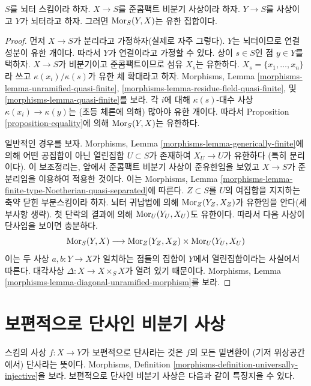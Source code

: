 \begin{lemma}
\label{lemma-finitely-many-maps-to-unramified}
$S$를 뇌터 스킴이라 하자. $X \to S$를 준콤팩트 비분기 사상이라 하자.
$Y \to S$를 사상이고 $Y$가 뇌터라고 하자. 그러면
$\mathop{\mathrm{Mor}}\nolimits_S(Y, X)$는 유한 집합이다.
\end{lemma}

\begin{proof}
먼저 $X \to S$가 분리라고 가정하자(실제로 자주 그렇다).
$Y$는 뇌터이므로 연결 성분이 유한 개이다. 따라서 $Y$가 연결이라고
가정할 수 있다. 상이 $s \in S$인 점 $y \in Y$를 택하자.
$X \to S$가 비분기이고 준콤팩트이므로 섬유 $X_s$는 유한하다.
$X_s = \{x_1, \ldots, x_n\}$라 쓰고
$\kappa(x_i)/\kappa(s)$가 유한 체 확대라고 하자.
Morphisms, Lemma \ref{morphisms-lemma-unramified-quasi-finite},
\ref{morphisms-lemma-residue-field-quasi-finite}, 및
\ref{morphisms-lemma-quasi-finite}를 보라.
각 $i$에 대해 $\kappa(s)$-대수 사상
$\kappa(x_i) \to \kappa(y)$는 (초등 체론에 의해) 많아야 유한 개이다.
따라서 Proposition \ref{proposition-equality}에 의해
$\mathop{\mathrm{Mor}}\nolimits_S(Y, X)$는 유한하다.

\medskip\noindent
일반적인 경우를 보자. Morphisms, Lemma
\ref{morphisms-lemma-generically-finite}에 의해 어떤 공집합이 아닌
열린집합 $U \subset S$가 존재하여 $X_U \to U$가 유한하다
(특히 분리이다). 이 보조정리는, 앞에서 준콤팩트 비분기 사상이
준유한임을 보였고 $X \to S$가 준분리임을 이용하여 적용한 것이다.
이는 Morphisms, Lemma
\ref{morphisms-lemma-finite-type-Noetherian-quasi-separated}에 따른다.
$Z \subset S$를 $U$의 여집합을 지지하는 축약 닫힌 부분스킴이라 하자.
뇌터 귀납법에 의해 $\mathop{\mathrm{Mor}}\nolimits_Z(Y_Z, X_Z)$가 유한임을 안다(세부사항 생략).
첫 단락의 결과에 의해 $\mathop{\mathrm{Mor}}\nolimits_U(Y_U, X_U)$도 유한이다.
따라서 다음 사상이 단사임을 보이면 충분하다.
$$
\mathop{\mathrm{Mor}}\nolimits_S(Y, X) \longrightarrow \mathop{\mathrm{Mor}}\nolimits_Z(Y_Z, X_Z) \times \mathop{\mathrm{Mor}}\nolimits_U(Y_U, X_U)
$$
이는 두 사상 $a, b : Y \to X$가 일치하는 점들의 집합이 $Y$에서
열린집합이라는 사실에서 따른다. 대각사상
$\Delta : X \to X \times_S X$가 열려 있기 때문이다.
Morphisms, Lemma \ref{morphisms-lemma-diagonal-unramified-morphism}를 보라.
\end{proof}



\section{보편적으로 단사인 비분기 사상}
\label{section-universally-injective-unramified}

\noindent
스킴의 사상 $f : X \to Y$가 보편적으로 단사라는 것은 $f$의 모든 밑변환이
(기저 위상공간에서) 단사라는 뜻이다. Morphisms, Definition
\ref{morphisms-definition-universally-injective}을 보라.
보편적으로 단사인 비분기 사상은 다음과 같이 특징지을 수 있다.

